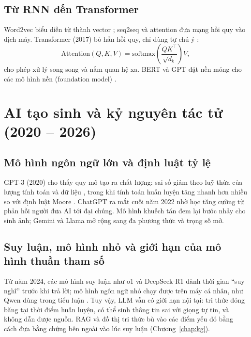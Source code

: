 \subsection{Từ RNN đến Transformer}
Word2vec biểu diễn từ thành vector \cite{ch1:mikolov2013}; seq2seq \cite{ch1:sutskever2014} và attention \cite{ch1:bahdanau2015} đưa mạng
hồi quy vào dịch máy. Transformer (2017) bỏ hẳn hồi quy, chỉ dùng tự chú ý \cite{ch1:vaswani2017}:
\begin{equation}
  \mathrm{Attention}(Q,K,V)=\mathrm{softmax}\!\left(\frac{QK^\top}{\sqrt{d_k}}\right)V,
\end{equation}
cho phép xử lý song song và nắm quan hệ xa. BERT \cite{ch1:devlin2019} và GPT \cite{ch1:radford2019,ch1:brown2020} đặt nền móng cho các
mô hình nền (foundation model) \cite{ch1:bommasani2021}.

\section{AI tạo sinh và kỷ nguyên tác tử (2020 -- 2026)}
\subsection{Mô hình ngôn ngữ lớn và định luật tỷ lệ}
GPT-3 (2020) cho thấy quy mô tạo ra chất lượng: sai số giảm theo luỹ thừa của lượng tính toán và dữ liệu \cite{ch1:kaplan2020,ch1:hoffmann2022},
trong khi tính toán huấn luyện tăng nhanh hơn nhiều so với định luật Moore \cite{ch1:sevilla2022}. ChatGPT ra mắt cuối năm 2022 nhờ học
tăng cường từ phản hồi người \cite{ch1:ouyang2022,ch1:christiano2017} đưa AI tới đại chúng. Mô hình khuếch tán \cite{ch1:ho2020} đem
lại bước nhảy cho sinh ảnh; Gemini \cite{ch1:gemini2023} và Llama \cite{ch1:touvron2023,ch1:llama3} mở rộng sang đa phương thức và trọng số mở.

\subsection{Suy luận, mô hình nhỏ và giới hạn của mô hình thuần tham số}
Từ năm 2024, các mô hình suy luận như o1 \cite{ch1:openai2024o1} và DeepSeek-R1 \cite{ch1:deepseek2025} dành thời gian ``suy nghĩ'' trước
khi trả lời; mô hình ngôn ngữ nhỏ chạy được trên máy cá nhân, như Qwen dùng trong tiểu luận \cite{ch0:qwen2024}. Tuy vậy, LLM vẫn có giới
hạn nội tại: tri thức đóng băng tại thời điểm huấn luyện, có thể sinh thông tin sai với giọng tự tin, và không dẫn được nguồn. RAG
\cite{ch1:lewis2020} và đồ thị tri thức bù vào các điểm yếu đó bằng cách đưa bằng chứng bên ngoài vào lúc suy luận (Chương~\ref{chap:kg}).

